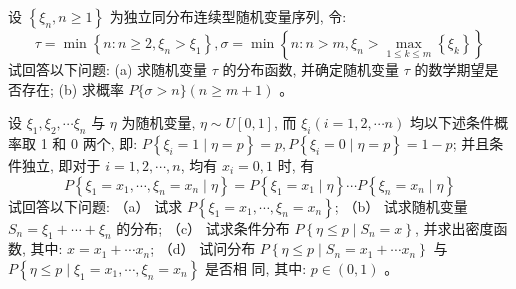 \documentclass[a4,10pt]{ctexart}
\begin{document}
    \begin{ti}{7}{}

       设 $\left\{\xi_n, n \geq 1\right\}$ 为独立同分布连续型随机变量序列, 令:
        $$
        \tau=\min \left\{n: n \geq 2, \xi_n>\xi_1\right\}, \sigma=\min \left\{n: n>m, \xi_n>\max _{1 \leq k \leq m}\left\{\xi_k\right\}\right\}
        $$
        试回答以下问题:
        (a) 求随机变量 $\tau$ 的分布函数, 并确定随机变量 $\tau$ 的数学期望是否存在;
        (b) 求概率 $P\{\sigma>n\}(n \geq m+1)$ 。
        

\end{ti}

\begin{qj}

\end{qj}


    
    \begin{ti}{8}{}

        设 $\xi_1, \xi_2, \cdots \xi_n$ 与 $\eta$ 为随机变量, $\eta \sim U[0,1]$, 而 $\xi_i(i=1,2, \cdots n)$ 均以下述条件概率取 1 和 0 两个, 即: $P\left\{\xi_i=1 \mid \eta=p\right\}=p, P\left\{\xi_i=0 \mid \eta=p\right\}=1-p$; 并且条件独立, 即对于 $i=1,2, \cdots, n$, 均有 $x_i=0,1$ 时, 有
        $$
        P\left\{\xi_1=x_1, \cdots, \xi_n=x_n \mid \eta\right\}=P\left\{\xi_1=x_1 \mid \eta\right\} \cdots P\left\{\xi_n=x_n \mid \eta\right\}
        $$
        试回答以下问题:
        （a） 试求 $P\left\{\xi_1=x_1, \cdots, \xi_n=x_n\right\}$;
        （b） 试求随机变量 $S_n=\xi_1+\cdots+\xi_n$ 的分布;
        （c） 试求条件分布 $P\left\{\eta \leq p \mid S_n=x\right\}$, 并求出密度函数, 其中: $x=x_1+\cdots x_n$;
        （d） 试问分布 $P\left\{\eta \leq p \mid S_n=x_1+\cdots x_n\right\}$ 与 $P\left\{\eta \leq p \mid \xi_1=x_1, \cdots, \xi_n=x_n\right\}$ 是否相 同, 其中: $p \in(0,1)$ 。


    \end{ti}




   
    


    

    

\end{document}
